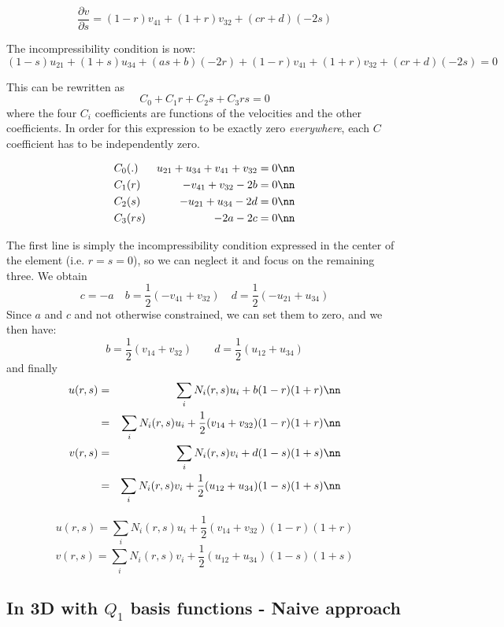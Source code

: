 \[
\frac{\partial v}{\partial s}=
(1-r) v_{41} + (1+r) v_{32}
+ (c r + d)(-2s)
\]


The incompressibility condition is now:
\[
(1-s) u_{21} + (1+s) u_{34} 
+ (a s + b) (-2r) +
(1-r) v_{41} + (1+r) v_{32}
+ (c r + d)(-2s)
=0
\]

This can be rewritten as
\[
C_0  + C_1 r + C_2 s + C_3 rs = 0
\]
where the four $C_i$ coefficients are functions of the velocities and the other coefficients.
In order for this expression to be exactly zero {\it everywhere}, each $C$ coefficient has
to be independently zero.

\begin{eqnarray}
C_0   &(.)  &  u_{21} + u_{34} + v_{41} + v_{32} =0\nn\\ 
C_1   &(r)  &  -v_{41} + v_{32} -2b =0\nn\\ 
C_2   &(s)  &  -u_{21} + u_{34} -2d =0 \nn\\ 
C_3   &(rs) &  -2a -2c =0\nn 
\end{eqnarray}

The first line is simply the incompressibility condition
expressed in the center of the element (i.e. $r=s=0$),
so we can neglect it and focus on the remaining three.
We obtain
\[
c=-a
\quad
b=\frac{1}{2}(-v_{41} + v_{32})
\quad
d=\frac{1}{2} (-u_{21} + u_{34})
\]
Since $a$ and $c$ and not otherwise constrained, we can set them to zero, and we then have:
\[
b=\frac{1}{2}(v_{14} + v_{32})
\quad\quad
d=\frac{1}{2} (u_{12} + u_{34})
\]
and finally
\begin{eqnarray}
u(r,s)
&=&\sum_i N_i(r,s) u_i + b(1-r)(1+r) \nn\\
&=&\sum_i N_i(r,s) u_i + \frac{1}{2}(v_{14} + v_{32})(1-r)(1+r) \nn\\
v(r,s)
&=&\sum_i N_i(r,s) v_i + d(1-s)(1+s) \nn\\
&=&\sum_i N_i(r,s) v_i + \frac{1}{2} (u_{12} + u_{34})(1-s)(1+s) \nn
\end{eqnarray}

\[
\boxed{
u(r,s)=\sum_i N_i(r,s) u_i + \frac{1}{2}(v_{14} + v_{32})(1-r)(1+r) 
}
\]
\[
\boxed{
v(r,s)
=\sum_i N_i(r,s) v_i + \frac{1}{2} (u_{12} + u_{34})(1-s)(1+s) 
}
\]


\subsection{In 3D with $Q_1$ basis functions - Naive approach}

